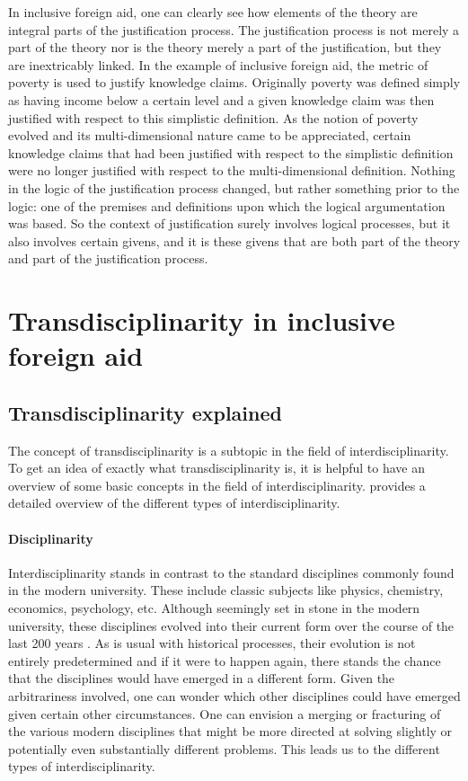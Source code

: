 \documentclass[a4paper]{article}
\begin{document}
In inclusive foreign aid, one can clearly see how elements of the theory are
integral parts of the justification process. The justification process is not
merely a part of the theory nor is the theory merely a part of the
justification, but they are inextricably linked. In the example of inclusive
foreign aid, the metric of poverty is used to justify knowledge claims.
Originally poverty was defined simply as having income below a certain level
and a given knowledge claim was then justified with respect to this simplistic
definition. As the notion of poverty evolved and its multi-dimensional nature
came to be appreciated, certain knowledge claims that had been justified with
respect to the simplistic definition were no longer justified with respect to
the multi-dimensional definition. Nothing in the logic of the justification
process changed, but rather something prior to the logic: one of the premises
and definitions upon which the logical argumentation was based. So the context
of justification surely involves logical processes, but it also involves
certain givens, and it is these givens that are both part of the theory and
part of the justification process.


\newpage

\section{Transdisciplinarity in inclusive foreign aid}

\subsection{Transdisciplinarity explained}

The concept of transdisciplinarity is a subtopic in the field of
interdisciplinarity. To get an idea of exactly what transdisciplinarity is, it
is helpful to have an overview of some basic concepts in the field of
interdisciplinarity. \cite{klein2010taxonomy} provides a detailed overview of
the different types of interdisciplinarity.

\paragraph{Disciplinarity}

Interdisciplinarity stands in contrast to the standard disciplines commonly
found in the modern university. These include classic subjects like physics,
chemistry, economics, psychology, etc. Although seemingly set in stone in the
modern university, these disciplines evolved into their current form over the
course of the last 200 years \cite{weingart2010short}. As is usual with
historical processes, their evolution is not entirely predetermined and if it
were to happen again, there stands the chance that the disciplines would have
emerged in a different form. Given the arbitrariness involved, one can wonder
which other disciplines could have emerged given certain other circumstances.
One can envision a merging or fracturing of the various modern disciplines
that might be more directed at solving slightly or potentially even
substantially different problems. This leads us to the different types of
interdisciplinarity.
\end{document}
